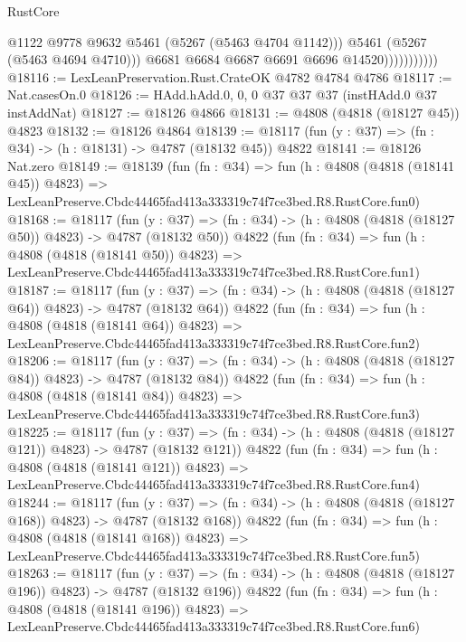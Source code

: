 \begin{lexlean}{RustCore}
\begin{coremodule}
                              @1122
                              @9778
                              @9632
                              @5461
                              (@5267 (@5463 @4704 @1142)))
                            @5461
                            (@5267 (@5463 @4694 @4710)))
                          @6681
                          @6684
                          @6687
                          @6691
                          @6696
                          @14520)))))))))))
@18116 := LexLeanPreservation.Rust.CrateOK @4782 @4784 @4786
@18117 := Nat.casesOn.{0}
@18126 := HAdd.hAdd.{0, 0, 0} @37 @37 @37 (instHAdd.{0} @37 instAddNat)
@18127 := @18126 @4866
@18131 := @4808 (@4818 (@18127 @45)) @4823
@18132 := @18126 @4864
@18139 := @18117 (fun (y : @37) => (fn : @34) -> (h : @18131) -> @4787 (@18132 @45)) @4822
@18141 := @18126 Nat.zero
@18149 := @18139
    (fun (fn : @34) =>
    fun (h : @4808 (@4818 (@18141 @45)) @4823) =>
    LexLeanPreserve.Cbdc44465fad413a333319c74f7ce3bed.R8.RustCore.fun0)
@18168 := @18117
    (fun (y : @37) => (fn : @34) -> (h : @4808 (@4818 (@18127 @50)) @4823) -> @4787 (@18132 @50))
    @4822
    (fun (fn : @34) =>
    fun (h : @4808 (@4818 (@18141 @50)) @4823) =>
    LexLeanPreserve.Cbdc44465fad413a333319c74f7ce3bed.R8.RustCore.fun1)
@18187 := @18117
    (fun (y : @37) => (fn : @34) -> (h : @4808 (@4818 (@18127 @64)) @4823) -> @4787 (@18132 @64))
    @4822
    (fun (fn : @34) =>
    fun (h : @4808 (@4818 (@18141 @64)) @4823) =>
    LexLeanPreserve.Cbdc44465fad413a333319c74f7ce3bed.R8.RustCore.fun2)
@18206 := @18117
    (fun (y : @37) => (fn : @34) -> (h : @4808 (@4818 (@18127 @84)) @4823) -> @4787 (@18132 @84))
    @4822
    (fun (fn : @34) =>
    fun (h : @4808 (@4818 (@18141 @84)) @4823) =>
    LexLeanPreserve.Cbdc44465fad413a333319c74f7ce3bed.R8.RustCore.fun3)
@18225 := @18117
    (fun (y : @37) => (fn : @34) -> (h : @4808 (@4818 (@18127 @121)) @4823) -> @4787 (@18132 @121))
    @4822
    (fun (fn : @34) =>
    fun (h : @4808 (@4818 (@18141 @121)) @4823) =>
    LexLeanPreserve.Cbdc44465fad413a333319c74f7ce3bed.R8.RustCore.fun4)
@18244 := @18117
    (fun (y : @37) => (fn : @34) -> (h : @4808 (@4818 (@18127 @168)) @4823) -> @4787 (@18132 @168))
    @4822
    (fun (fn : @34) =>
    fun (h : @4808 (@4818 (@18141 @168)) @4823) =>
    LexLeanPreserve.Cbdc44465fad413a333319c74f7ce3bed.R8.RustCore.fun5)
@18263 := @18117
    (fun (y : @37) => (fn : @34) -> (h : @4808 (@4818 (@18127 @196)) @4823) -> @4787 (@18132 @196))
    @4822
    (fun (fn : @34) =>
    fun (h : @4808 (@4818 (@18141 @196)) @4823) =>
    LexLeanPreserve.Cbdc44465fad413a333319c74f7ce3bed.R8.RustCore.fun6)

\end{coremodule}
\end{lexlean}
